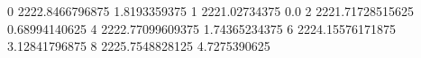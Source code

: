 0 2222.8466796875 1.8193359375
1 2221.02734375 0.0
2 2221.71728515625 0.68994140625
4 2222.77099609375 1.74365234375
6 2224.15576171875 3.12841796875
8 2225.7548828125 4.7275390625
